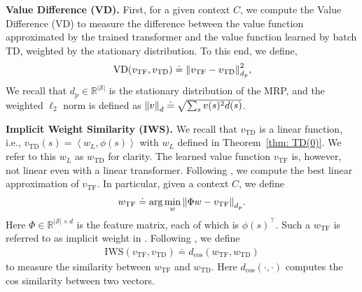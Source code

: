 \documentclass{article}
\newcommand{\fS}{\mathcal{S}}
\newcommand{\R}{\mathbb{R}}
\newcommand{\ns}{{|\fS|}}
\newcommand{\tb}[1]{{\textbf{#1}}}
\newcommand{\indot}[2]{{\left<#1, #2\right>}}
\newcommand{\attn}{\text{LinAttn}}
\newcommand{\tf}{\text{TF}}
\newcommand{\td}{\text{TD}}
\begin{document}

\tb{Value Difference (VD).}
First, for a given context $C$, 
we compute the Value Difference (VD) to measure the difference between the value function approximated by the trained transformer and the value function learned by batch TD, 
weighted by the stationary distribution.
To this end, we define,
\begin{align}
    \text{VD}(v_\tf, v_\td) \doteq \norm{v_\tf - v_\td}_{d_p}^2,
\end{align}
We recall that $d_p \in \R^\ns$ is the stationary distribution of the MRP, and the weighted $\ell_2$ norm is defined as $\norm{v}_d \doteq \sqrt{\sum_s v(s)^2 d(s)}$.

\tb{Implicit Weight Similarity (IWS).}
We recall that $v_\td$ is a linear function, i.e., $v_\td(s) = \indot{w_L}{\phi(s)}$ with $w_L$ defined in Theorem~\ref{thm: TD(0)}.
We refer to this $w_L$ as $w_\td$ for clarity.
The learned value function $v_\tf$ is, however, not linear even with a linear transformer.
Following \citet{akyurek2023learning},
we compute the best linear approximation of $v_\tf$.
In particular,
given a context $C$,
we define
\begin{align}
    w_\tf \doteq \arg\min_w \norm{\Phi w - v_\tf}_{d_p}. 
\end{align}
Here $\Phi \in \R^{\ns \times d}$ is the feature matrix,
each of which is $\phi(s)^\top$.
Such a $w_\tf$ is referred to as implicit weight in \citet{akyurek2023learning}.
Following \citet{akyurek2023learning},
we define 
\begin{align}
    \text{IWS}(v_\tf, v_\td) \doteq d_\text{cos}(w_\tf, w_\td)
\end{align}
to measure the similarity between $w_\tf$ and $w_\td$.
Here $d_\text{cos}(\cdot, \cdot)$ computes the cos similarity between two vectors.
\end{document}
